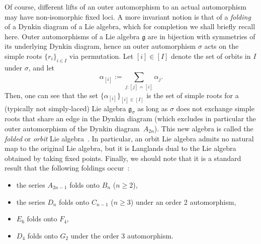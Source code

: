 \documentclass[pdftex]{sigma}
\numberwithin{equation}{section}
\begin{document}
 Of course, different lifts of an outer automorphism to an actual automorphism may have non-isomorphic fixed loci. A more invariant notion is that of a \textit{folding} of a Dynkin diagram of a Lie algebra, which for completion we shall briefly recall here. Outer automorphisms of a Lie algebra $\mathfrak{g}$ are in bijection with symmetries of its underlying Dynkin diagram, hence an outer automorphism $\sigma$ acts on the simple roots $\{ r_i \}_{i \in I}$ via permutation. Let $[i] \in [I]$ denote the set of orbits in $I$ under $\sigma$, and let
 \[ \alpha_{[i]} := \sum_{j \colon [j] = [i]} \alpha_j.\] Then, one can see that the set $\{ \alpha_{[i]} \}_{[i] \in [I]}$ is the set of simple roots for a (typically not simply-laced) Lie algebra $\mathfrak{g}_\sigma$ as long as $\sigma$ does not exchange simple roots that share an edge in the Dynkin diagram (which excludes in particular the outer automorphism of the Dynkin diagram~$A_{2n}$). This new algebra is called the \textit{folded} or \textit{orbit} Lie algebra~\cite{FSS}. In particular, an orbit Lie algebra admits no natural map to the original Lie algebra, but it is Langlands dual to the Lie algebra obtained by taking fixed points. Finally, we should note that it is a standard result that the following foldings occur~\cite{Springer}:
 \begin{itemize}\itemsep=0pt
 \item the series $A_{2n-1}$ folds onto $B_n$ ($n \geq 2$),
 \item the series $D_n$ folds onto $C_{n-1}$ ($n \geq 3$) under an order 2 automorphism,
 \item $E_6$ folds onto $F_4$,
 \item $D_4$ folds onto $G_2$ under the order 3 automorphism.
 \end{itemize}
\end{document}
